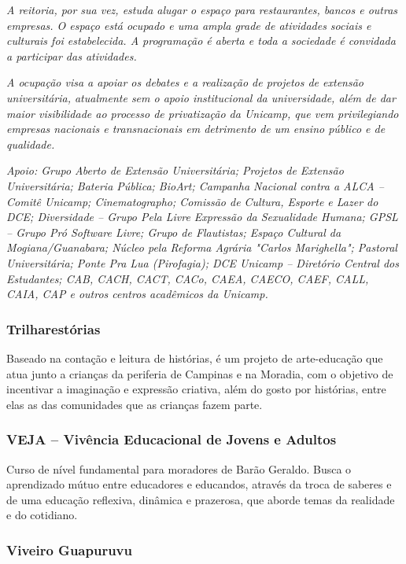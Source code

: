 \textit{A reitoria, por sua vez, estuda alugar o espaço para restaurantes, bancos e outras empresas. O espaço está ocupado e uma ampla grade de atividades sociais e culturais foi estabelecida. A programação é aberta e toda a sociedade é convidada a participar das atividades.}

\textit{A ocupação visa a apoiar os debates e a realização de projetos de extensão universitária, atualmente sem o apoio institucional da universidade, além de dar maior visibilidade ao processo de privatização da Unicamp, que vem privilegiando empresas nacionais e transnacionais em detrimento de um ensino público e de qualidade.}

\textit{Apoio: Grupo Aberto de Extensão Universitária; Projetos de Extensão Universitária; Bateria Pública; BioArt; Campanha Nacional contra a ALCA -- Comitê Unicamp; Cinematographo; Comissão de Cultura, Esporte e Lazer do DCE; Diversidade -- Grupo Pela Livre Expressão da Sexualidade Humana; GPSL -- Grupo Pró Software Livre; Grupo de Flautistas; Espaço Cultural da Mogiana/Guanabara; Núcleo pela Reforma Agrária "Carlos Marighella"; Pastoral Universitária; Ponte Pra Lua (Pirofagia); DCE Unicamp -- Diretório Central dos Estudantes; CAB, CACH, CACT, CACo, CAEA, CAECO, CAEF, CALL, CAIA, CAP e outros centros acadêmicos da Unicamp.}

\subsubsection{Trilharestórias}

Baseado na contação e leitura de histórias, é um projeto de arte-educação que
atua junto a crianças da periferia de Campinas e na Moradia, com o objetivo de
incentivar a imaginação e expressão criativa, além do gosto por histórias, entre
elas as das comunidades que as crianças fazem parte.

\subsubsection{VEJA -- Vivência Educacional de Jovens e Adultos}

Curso de nível fundamental para moradores de Barão Geraldo. Busca o aprendizado
mútuo entre educadores e educandos, através da troca de saberes e de uma
educação reflexiva, dinâmica e prazerosa, que aborde temas da realidade e do
cotidiano.

\subsubsection{Viveiro Guapuruvu}


